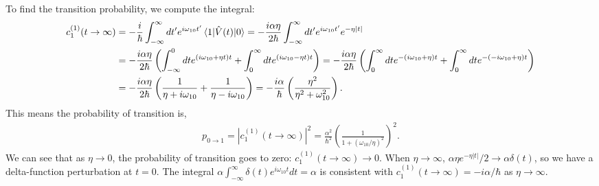 \documentclass[10pt]{article}
\newcommand{\1}{\mathbf 1}
\begin{document}
To find the transition probability, we compute the integral:
\begin{align}
	c_{1}^{(1)}(t \to \infty)
	&=\nonumber
	-\frac{i}{\hbar}
	\int_{-\infty}^\infty
	dt'
	e^{i \omega_{10} t'}
	\braket{1 | \hat V(t) | 0}
	=
	-\frac{i\alpha\eta}{2\hbar}
	\int_{-\infty}^\infty
	dt'
	e^{i \omega_{10} t'}
	e^{-\eta |t|}
	\\
	&
	=
	-
	\frac{i\alpha\eta}{2\hbar}
	\left(
		\int_{-\infty}^0 dt e^{(i \omega_{10} + \eta t)t}
		+
		\int_{0}^{\infty} dt e^{(i \omega_{10} - \eta t)t}
	\right)
	=
	-
	\frac{i\alpha\eta}{2\hbar}
	\left(
		\int_{0}^\infty dt e^{-(i \omega_{10} + \eta )t}
		+
		\int_{0}^{\infty} dt e^{-(-i \omega_{10} + \eta )t}
	\right)
	\nonumber
	\\
	&
	=
	-
	\frac{i\alpha\eta}{2\hbar}
	\left(
		\frac{1}{\eta + i \omega_{10}}
		+
		\frac{1}{\eta - i \omega_{10}}
	\right)
	=
	-
	\frac{i\alpha}{\hbar}
	\left(
		\frac{\eta^2}{\eta^2 + \omega_{10}^2}
	\right).
\end{align}
This means the probability of transition is,
\begin{align}
	p_{0 \to 1}
	=
	|c_1^{(1)}(t \to \infty)|^2
	=
	\frac{\alpha^2}{\hbar^2}
	\left(
		\frac{1}{1 + (\omega_{10}/\eta)^2}
	\right)^2.
\end{align}
We can see that as $\eta \to 0$, the probability of transition goes to zero: $c_1^{(1)} (t \to \infty)\to 0$.
When $\eta \to \infty$, $\alpha \eta e^{-\eta|t|}/2 \to \alpha \delta(t)$, so we have a delta-function perturbation at $t=0$.
The integral $\alpha\int_{-\infty}^\infty \delta(t) e^{i \omega_{10}t} dt = \alpha$ is consistent with $c_1^{(1)} (t \to \infty) = -i\alpha/\hbar$ as $\eta \to \infty$.



\end{document}
